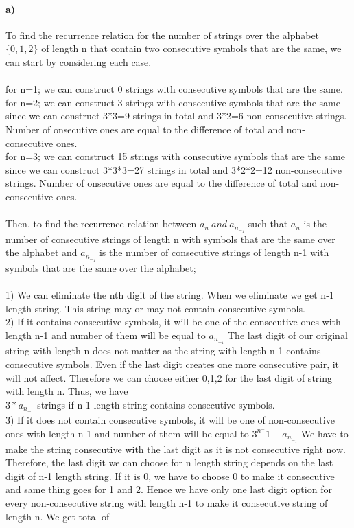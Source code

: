 \documentclass[11pt]{article}
\begin{document}
\paragraph{\textbf{a)}}
To find the recurrence relation for the number of strings over the alphabet 
$\{0,1,2\}$
of length n that contain two consecutive symbols that are the same, we can start by considering each case. \\\\
for n=1; we can construct 0 strings with consecutive symbols that are the same. \\
for n=2; we can construct 3 strings with consecutive symbols that are the same since we can construct 3*3=9 strings in total and 3*2=6 non-consecutive strings. Number of onsecutive ones are equal to the difference of total and non-consecutive ones. \\
for n=3; we can construct 15 strings with consecutive symbols that are the same since we can construct 3*3*3=27 strings in total and 3*2*2=12 non-consecutive strings. Number of onsecutive ones are equal to the difference of total and non-consecutive ones. \\\\
Then, to find the recurrence relation between 
$a_n \ and \ a_n_-_1$
such that
$a_n$ 
is the number of consecutive strings of length n with symbols that are the same over the alphabet and
$a_n_-_1$
is the number of consecutive strings of length n-1 with symbols that are the same over the alphabet; \\\\
1) We can eliminate the nth digit of the string. When we eliminate we get n-1 length string. This string may or may not contain consecutive symbols. \\
2) If it contains consecutive symbols, it will be one of the consecutive ones with length n-1 and number of them will be equal to 
$a_n_-_1$
The last digit of our original string with length n does not matter as the string with length n-1 contains consecutive symbols. Even if the last digit creates one more consecutive pair, it will not affect. Therefore we can choose either 0,1,2 for the last digit of string with length n. Thus, we have \\
$3*a_n_-_1$
strings if n-1 length string contains consecutive symbols.\\
3) If it does not contain consecutive symbols, it will be one of non-consecutive ones with length n-1 and number of them will be equal to
$3^n^-1 - a_n_-_1$
We have to make the string consecutive with the last digit as it is not consecutive right now. Therefore, the last digit we can choose for n length string depends on the last digit of n-1 length string. If it is 0, we have to choose 0 to make it consecutive and same thing goes for 1 and 2. Hence we have only one last digit option for every non-consecutive string with length n-1 to make it consecutive string of length n. We get total of 
\end{document}

